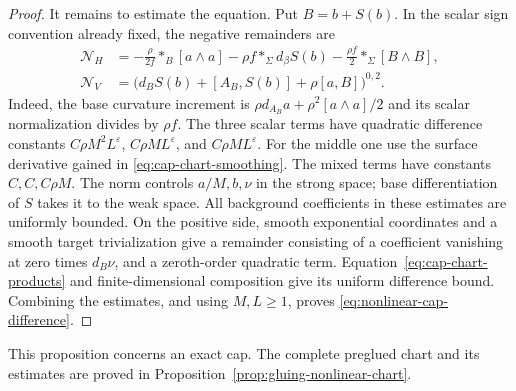 \documentclass[11pt]{amsart}
\theoremstyle{definition}
\theoremstyle{remark}
\theoremstyle{plain}
\begin{document}
\begin{proof}
It remains to estimate the equation. Put $B=b+S(b)$.
In the scalar sign convention already fixed, the negative
remainders are
\begin{equation}\label{eq:cap-nonlinear-rows}
 \begin{aligned}
  \mathcal N_H
   &=-\frac{\rho}{2f}*_B[a\wedge a]
     -\rho f *_\Sigma d_\beta S(b)
     -\frac{\rho f}{2}*_\Sigma[B\wedge B],\\
  \mathcal N_V
   &=\bigl(d_BS(b)+[A_B,S(b)]+\rho[a,B]\bigr)^{0,2}.
 \end{aligned}
\end{equation}
Indeed, the base curvature increment is
$\rho d_{A_B}a+\rho^2[a\wedge a]/2$ and its scalar
normalization divides by $\rho f$.
The three scalar terms have quadratic difference constants
$C\rho M^2L^\varepsilon$, $C\rho ML^\varepsilon$, and
$C\rho ML^\varepsilon$. For the middle one use the surface
derivative gained in \eqref{eq:cap-chart-smoothing}.
The mixed terms have constants $C,C,C\rho M$.
The norm controls $a/M,b,\nu$ in the strong space; base
differentiation of $S$ takes it to the weak space.
All background coefficients in these estimates are uniformly
bounded. On the positive side, smooth exponential coordinates
and a smooth target trivialization give a remainder consisting
of a coefficient vanishing at zero times $d_B\nu$, and a
zeroth-order quadratic term. Equation~\eqref{eq:cap-chart-products}
and finite-dimensional composition give its uniform difference
bound. Combining the estimates, and using $M,L\geq1$, proves
\eqref{eq:nonlinear-cap-difference}.
\end{proof}

This proposition concerns an exact cap. The complete preglued chart
and its estimates are proved in Proposition~\ref{prop:gluing-nonlinear-chart}.
\end{document}
